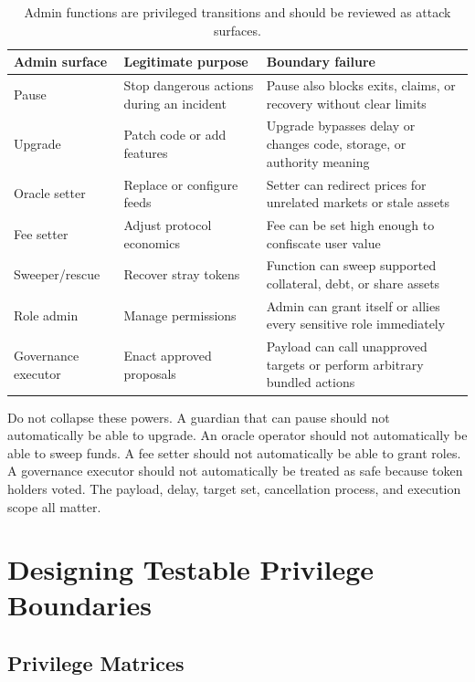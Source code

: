 \begin{table}[htbp]
\centering
\small
\renewcommand{\arraystretch}{1.18}
\begin{tabularx}{\textwidth}{@{}>{\RaggedRight\arraybackslash}p{}>{\RaggedRight\arraybackslash}p{}X@{}}
\toprule
Admin surface & Legitimate purpose & Boundary failure \\
\midrule
Pause & Stop dangerous actions during an incident & Pause also blocks exits, claims, or recovery without clear limits \\
Upgrade & Patch code or add features & Upgrade bypasses delay or changes code, storage, or authority meaning \\
Oracle setter & Replace or configure feeds & Setter can redirect prices for unrelated markets or stale assets \\
Fee setter & Adjust protocol economics & Fee can be set high enough to confiscate user value \\
Sweeper/rescue & Recover stray tokens & Function can sweep supported collateral, debt, or share assets \\
Role admin & Manage permissions & Admin can grant itself or allies every sensitive role immediately \\
Governance executor & Enact approved proposals & Payload can call unapproved targets or perform arbitrary bundled actions \\
\bottomrule
\end{tabularx}
\caption{Admin functions are privileged transitions and should be reviewed as attack surfaces.}
\end{table}

Do not collapse these powers. A guardian that can pause should not automatically be able to upgrade. An oracle operator should not automatically be able to sweep funds. A fee setter should not automatically be able to grant roles. A governance executor should not automatically be treated as safe because token holders voted. The payload, delay, target set, cancellation process, and execution scope all matter.

\section{Designing Testable Privilege Boundaries}

\subsection{Privilege Matrices}

